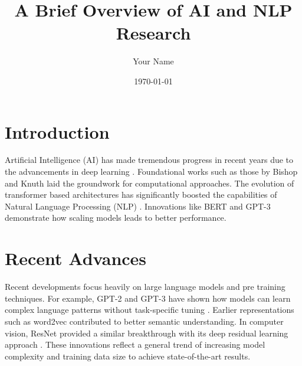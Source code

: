 \documentclass[12pt]{article}
\begin{document}
\title{A Brief Overview of AI and NLP Research}
\author{Your Name}
\date{\today}
\maketitle

\section*{Introduction}
Artificial Intelligence (AI) has made tremendous progress in recent years due to the advancements in deep learning \cite{lecun2015deep, goodfellow2016deep}. Foundational works such as those by Bishop \cite{bishop2006pattern} and Knuth \cite{knuth1984texbook} laid the groundwork for computational approaches. The evolution of transformer based architectures has significantly boosted the capabilities of Natural Language Processing (NLP) \cite{vaswani2017attention, devlin2018bert}. Innovations like BERT \cite{devlin2018bert} and GPT-3 \cite{brown2020gpt3} demonstrate how scaling models leads to better performance.

\section*{Recent Advances}
Recent developments focus heavily on large language models and pre training techniques. For example, GPT-2 and GPT-3 have shown how models can learn complex language patterns without task-specific tuning \cite{radford2019gpt2, brown2020gpt3}. Earlier representations such as word2vec \cite{mikolov2013word2vec} contributed to better semantic understanding. In computer vision, ResNet provided a similar breakthrough with its deep residual learning approach \cite{he2016resnet}. These innovations reflect a general trend of increasing model complexity and training data size to achieve state-of-the-art results.

\printbibliography
\end{document}
